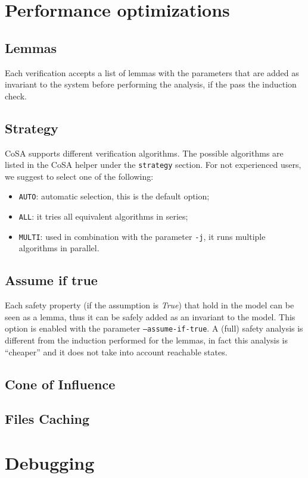 \documentclass{article}
\theoremstyle{definition}
\begin{document}
\section{Performance optimizations}
\label{sec:optimizations}

\subsection{Lemmas}
Each verification accepts a list of lemmas with the parameters that
are added as invariant to the system before performing the analysis,
if the pass the induction check.

\subsection{Strategy}
CoSA supports different verification algorithms. The possible
algorithms are listed in the CoSA helper under the \texttt{strategy}
section. For not experienced users, we suggest to select one of the
following:
\begin{itemize}
\item \texttt{AUTO}: automatic selection, this is the default option;
\item \texttt{ALL}: it tries all equivalent algorithms in series;
\item \texttt{MULTI}: used in combination with the parameter
  \texttt{-j}, it runs multiple algorithms in parallel.
\end{itemize}

\subsection{Assume if true}
Each safety property (if the assumption is \emph{True}) that hold in
the model can be seen as a lemma, thus it can be safely added as an
invariant to the model. This option is enabled with the parameter
\texttt{--assume-if-true}. A (full) safety analysis is different from
the induction performed for the lemmas, in fact this analysis is
``cheaper'' and it does not take into account reachable states.

\subsection{Cone of Influence}



\subsection{Files Caching}


\section{Debugging}
\label{sec:debugging}

\newpage


\end{document}
